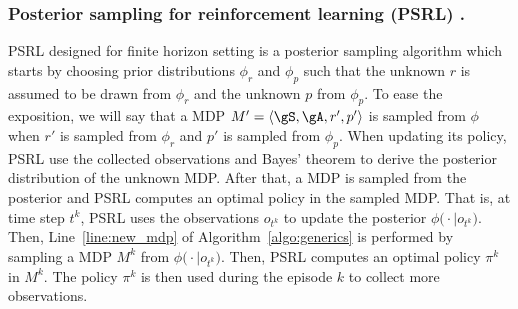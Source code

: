 \subsubsection{Posterior sampling for reinforcement learning (PSRL) \texorpdfstring{\cite{osband2013more}}{[ORV13]}.}

PSRL designed for finite horizon setting is a posterior sampling algorithm which starts by choosing prior distributions $\phi_r$ and $\phi_p$ such that the unknown $r$ is assumed to be drawn from $\phi_r$ and the unknown $p$ from $\phi_p$.
To ease the exposition, we will say that a MDP $M'=\langle\gS,\gA,r',p'\rangle$ is sampled from $\phi$ when $r'$ is sampled from $\phi_r$ and $p'$ is sampled from $\phi_p$.
When updating its policy, PSRL use the collected observations and Bayes' theorem to derive the posterior distribution of the unknown MDP.
After that, a MDP is sampled from the posterior and PSRL computes an optimal policy in the sampled MDP.
That is, at time step $t^k$, PSRL uses the observations $o_{t^k}$ to update the posterior $\phi\bigl(\cdot\mid o_{t^k}\bigr)$.
Then, Line~\ref{line:new_mdp} of Algorithm~\ref{algo:generics} is performed by sampling a MDP $M^k$ from $\phi\bigl(\cdot\mid o_{t^k}\bigr)$. Then, PSRL computes an optimal policy $\pi^k$ in $M^k$.
The policy $\pi^k$ is then used during the episode $k$ to collect more observations.

